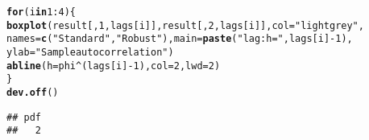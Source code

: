\documentclass{article}\usepackage[]{graphicx}\usepackage[]{color}
\makeatletter
\newcommand{\hlnum}[1]{\textcolor[rgb]{0.686,0.059,0.569}{#1}}%
\newcommand{\hlstr}[1]{\textcolor[rgb]{0.192,0.494,0.8}{#1}}%
\newcommand{\hlopt}[1]{\textcolor[rgb]{0,0,0}{#1}}%
\newcommand{\hlstd}[1]{\textcolor[rgb]{0.345,0.345,0.345}{#1}}%
\newcommand{\hlkwa}[1]{\textcolor[rgb]{0.161,0.373,0.58}{\textbf{#1}}}%
\newcommand{\hlkwc}[1]{\textcolor[rgb]{0.333,0.667,0.333}{#1}}%
\newcommand{\hlkwd}[1]{\textcolor[rgb]{0.737,0.353,0.396}{\textbf{#1}}}%
\newenvironment{kframe}{%
 \def\at@end@of@kframe{}%
 \ifinner\ifhmode%
  \def\at@end@of@kframe{\end{minipage}}%
  \begin{minipage}{\columnwidth}%
 \fi\fi%
 \def\FrameCommand##1{\hskip\@totalleftmargin \hskip-\fboxsep
 \colorbox{shadecolor}{##1}\hskip-\fboxsep
     \hskip-\linewidth \hskip-\@totalleftmargin \hskip\columnwidth}%
 \MakeFramed {\advance\hsize-\width
   \@totalleftmargin\z@ \linewidth\hsize
   \@setminipage}}%
 {\par\unskip\endMakeFramed%
 \at@end@of@kframe}
\newenvironment{knitrout}{}{} %
\makeatother
\begin{document}
\begin{knitrout}
\begin{kframe}
\begin{alltt}
\hlkwa{for} \hlstd{(i} \hlkwa{in} \hlnum{1}\hlopt{:}\hlnum{4}\hlstd{)\{}
  \hlkwd{boxplot}\hlstd{(result[,}\hlnum{1}\hlstd{,lags[i]], result[,}\hlnum{2}\hlstd{,lags[i]],} \hlkwc{col} \hlstd{=} \hlstr{"lightgrey"}\hlstd{,}
          \hlkwc{names} \hlstd{=} \hlkwd{c}\hlstd{(}\hlstr{"Standard"}\hlstd{,}\hlstr{"Robust"}\hlstd{),} \hlkwc{main} \hlstd{=} \hlkwd{paste}\hlstd{(}\hlstr{"lag: h = "}\hlstd{, lags[i]}\hlopt{-}\hlnum{1}\hlstd{),}
          \hlkwc{ylab} \hlstd{=} \hlstr{"Sample autocorrelation"}\hlstd{)}
  \hlkwd{abline}\hlstd{(}\hlkwc{h} \hlstd{= phi}\hlopt{^}\hlstd{(lags[i]}\hlopt{-}\hlnum{1}\hlstd{),} \hlkwc{col} \hlstd{=} \hlnum{2}\hlstd{,} \hlkwc{lwd} \hlstd{=} \hlnum{2}\hlstd{)}
\hlstd{\}}
\hlkwd{dev.off}\hlstd{()}
\end{alltt}
\begin{verbatim}
## pdf 
##   2
\end{verbatim}
\end{kframe}
\end{knitrout}
\end{document}
